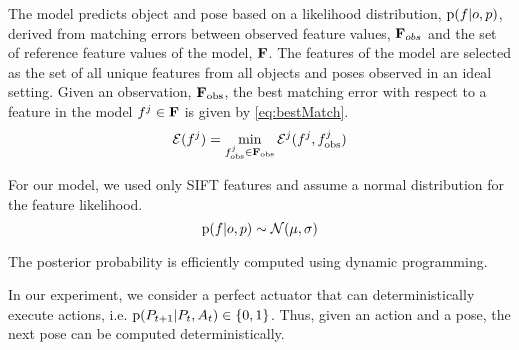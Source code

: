             The model predicts object and pose based on a likelihood distribution, $\text{p}(f|o,p)$, derived from matching errors between observed feature values, $\mathbf{F}_{obs}$ and the set of reference feature values of the model, $\mathbf{F}$. The features of the model are selected as the set of all unique features from all objects and poses observed in an ideal setting. Given an observation, $\mathbf{F}_{\text{obs}}$, the best matching error with respect to a feature in the model $f^j \in \mathbf{F}$ is given by \eqref{eq:bestMatch}.
            \begin{equation}
                \label{eq:bestMatch}
                \cursive{E}(f^j) = \min_{f^j_{\text{obs}} \in \set{F}_{\text{obs}}}\cursive{E}^j(f^j,f^j_{\text{obs}})
            \end{equation}
            

            For our model, we used only SIFT features and assume a normal distribution for the feature likelihood.   
            \begin{equation}
                \text{p}(f|o,p) \sim \mathcal{N}(\mu,\sigma)
            \end{equation}

            The posterior probability is efficiently computed using dynamic programming.
            

            In our experiment, we consider a perfect actuator that can deterministically execute actions, i.e. $\text{p}(P_{t+1}|P_t,A_t) \in \{ 0 , 1 \}$. Thus, given an action and a pose, the next pose can be computed deterministically. 

